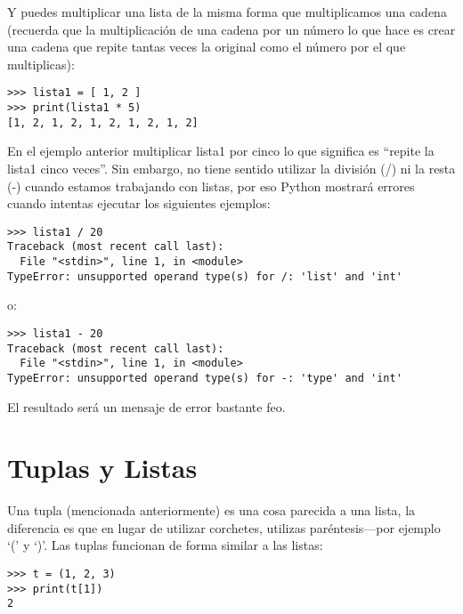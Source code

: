 \noindent
Y puedes multiplicar una lista de la misma forma que multiplicamos una cadena (recuerda que la multiplicación de una cadena por un número lo que hace es crear una cadena que repite tantas veces la original como el número por el que multiplicas):

\begin{listing}
\begin{verbatim}
>>> lista1 = [ 1, 2 ]
>>> print(lista1 * 5)
[1, 2, 1, 2, 1, 2, 1, 2, 1, 2]
\end{verbatim}
\end{listing}

\noindent
En el ejemplo anterior multiplicar lista1 por cinco lo que significa es ``repite la lista1 cinco veces''. Sin embargo, no tiene sentido utilizar la división (/) ni la resta (-) cuando estamos trabajando con listas, por eso Python mostrará errores cuando intentas ejecutar los siguientes ejemplos:

\begin{listing}
\begin{verbatim}
>>> lista1 / 20
Traceback (most recent call last):
  File "<stdin>", line 1, in <module>
TypeError: unsupported operand type(s) for /: 'list' and 'int'
\end{verbatim}
\end{listing}

\noindent
o:

\begin{listing}
\begin{verbatim}
>>> lista1 - 20
Traceback (most recent call last):
  File "<stdin>", line 1, in <module>
TypeError: unsupported operand type(s) for -: 'type' and 'int'
\end{verbatim}
\end{listing}

\noindent
El resultado será un mensaje de error bastante feo.

\section{Tuplas y Listas}\label{tuplesandlists}

Una tupla (mencionada anteriormente) es una cosa parecida a una lista, la diferencia es que en lugar de utilizar corchetes, utilizas paréntesis---por ejemplo `(' y `)'. Las tuplas funcionan de forma similar a las listas:

\begin{listing}
\begin{verbatim}
>>> t = (1, 2, 3)
>>> print(t[1])
2
\end{verbatim}
\end{listing}

